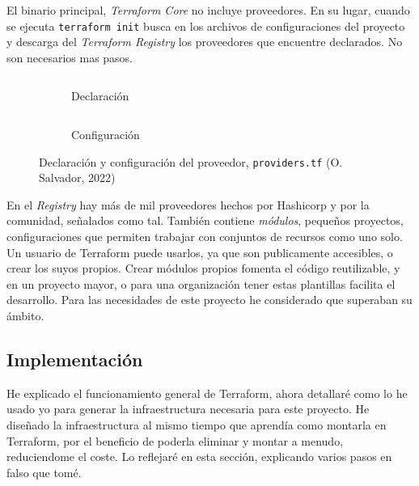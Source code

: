 \documentclass[11pt]{article}
\begin{document}
\begin{flushleft}
		
		El binario principal, \textit{Terraform Core} no incluye proveedores. En su lugar, cuando se ejecuta \texttt{terraform init} busca en los archivos de configuraciones del proyecto y descarga del \textit{Terraform Registry} los proveedores que encuentre declarados. No son necesarios mas pasos.
		\linebreak
		
		\begin{figure}[htb]
			\centering
			\begin{subfigure}{.35\linewidth}
				\inputminted[fontsize=\scriptsize, firstline=1, lastline=8, linenos, frame=single, breaklines]{javascript}{../../terraform/providers.tf}
				\caption{Declaración}
			\end{subfigure}
			\hspace{1.5cm}
			\begin{subfigure}{.4\linewidth}
				\inputminted[fontsize=\scriptsize, firstline=10, lastline=15, linenos, frame=single, breaklines]{javascript}{../../terraform/providers.tf}
				\vspace{.99cm}
				\caption{Configuración}
			\end{subfigure}
			\caption{Declaración y configuración del proveedor, \texttt{providers.tf} (O. Salvador, 2022)}
		\end{figure}
		
		En el \textit{Registry} hay más de mil proveedores hechos por Hashicorp y por la comunidad, señalados como tal. También contiene \textit{módulos}, pequeños proyectos, configuraciones que permiten trabajar con conjuntos de recursos como uno solo. Un usuario de Terraform puede usarlos, ya que son publicamente accesibles, o crear los suyos propios.	Crear módulos propios fomenta el código reutilizable, y en un proyecto mayor, o para una organización tener estas plantillas facilita el desarrollo. Para las necesidades de este proyecto he considerado que superaban su ámbito.






	\clearpage
	\subsection{Implementación}
		He explicado el funcionamiento general de Terraform, ahora detallaré como lo he usado yo para generar la infraestructura necesaria para este proyecto. He diseñado la infraestructura al mismo tiempo que aprendía como montarla en Terraform, por el beneficio de poderla eliminar y montar a menudo, reduciendome el coste. Lo reflejaré en esta sección, explicando varios pasos en falso que tomé.
	 \linebreak
	 

\end{flushleft}
\end{document}
